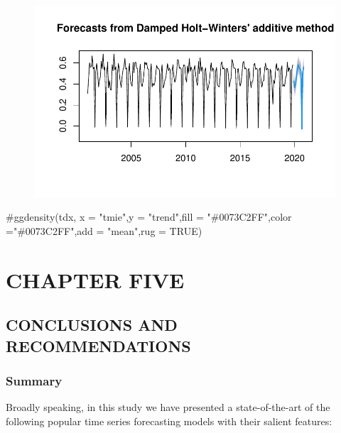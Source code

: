 \documentclass[
  letterpaper,
  DIV=11,
  numbers=noendperiod]{scrartcl}
\newenvironment{Shaded}{\begin{snugshade}}{\end{snugshade}}
\newcommand{\CommentTok}[1]{\textcolor[rgb]{0.37,0.37,0.37}{#1}}
\begin{document}
\begin{figure}[H]

{\centering \includegraphics{Quarto_files/figure-pdf/unnamed-chunk-22-1.pdf}

}

\end{figure}

\begin{Shaded}
\begin{Highlighting}[]
\CommentTok{\#ggdensity(tdx, x = "tmie",y = "trend",fill = "\#0073C2FF",color ="\#0073C2FF",add = "mean",rug = TRUE)}
\end{Highlighting}
\end{Shaded}

\hypertarget{chapter-five}{%
\section{CHAPTER FIVE}\label{chapter-five}}

\hypertarget{conclusions-and-recommendations}{%
\subsection{CONCLUSIONS AND
RECOMMENDATIONS}\label{conclusions-and-recommendations}}

\hypertarget{summary}{%
\subsubsection{Summary}\label{summary}}

Broadly speaking, in this study we have presented a state-of-the-art of
the following popular time series forecasting models with their salient
features:
\end{document}
